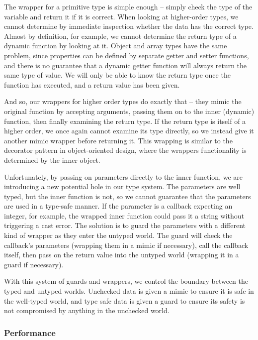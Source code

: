\documentclass[12pt,a4paper,twoside,openright]{report}
\theoremstyle{definition}
\theoremstyle{dotless}
\begin{document}
The wrapper for a primitive type is simple enough -- simply check the type of
the variable and return it if it is correct. When looking at higher-order
types, we cannot determine by immediate inspection whether the data has the
correct type. Almost by definition, for example, we cannot determine the return
type of a dynamic function by looking at it. Object and array types have the
same problem, since properties can be defined by separate getter and setter
functions, and there is no guarantee that a dynamic getter function will always
return the same type of value. We will only be able to know the return type
once the function has executed, and a return value has been given.

And so, our wrappers for higher order types do exactly that -- they mimic the
original function by accepting arguments, passing them on to the inner
(dynamic) function, then finally examining the return type. If the return type
is itself of a higher order, we once again cannot examine its type directly, so
we instead give it another mimic wrapper before returning it. This wrapping is
similar to the decorator pattern in object-oriented design, where the wrappers
functionality is determined by the inner object. 

Unfortunately, by passing on parameters directly to the inner function, we are
introducing a new potential hole in our type system. The parameters are well
typed, but the inner function is not, so we cannot guarantee that the
parameters are used in a type-safe manner. If the parameter is a callback
expecting an integer, for example, the wrapped inner function could pass it a
string without triggering a cast error. The solution is to guard the parameters
with a different kind of wrapper as they enter the untyped world. The guard
will check the callback's parameters (wrapping them in a mimic if necessary),
call the callback itself, then pass on the return value into the untyped world
(wrapping it in a guard if necessary). 

With this system of guards and wrappers, we control the boundary between the
typed and untyped worlds. Unchecked data is given a mimic to ensure it is safe
in the well-typed world, and type safe data is given a guard to ensure its
safety is not compromised by anything in the unchecked world.

\subsubsection*{Performance}
\end{document}
